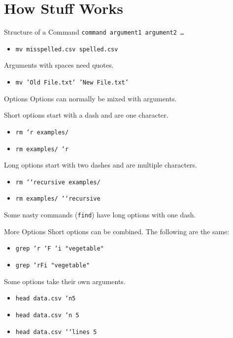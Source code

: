 \documentclass[pdf,usenames,dvipsnames,14pt]{beamer}%
\newcommand\hyphen{\char`\-}
\begin{document}
\section{How Stuff Works}

\begin{frame}{Structure of a Command}
	\texttt{command argument1 argument2 \dots}
	\begin{itemize}
		\item \texttt{mv misspelled.csv spelled.csv}
	\end{itemize}
	
	Arguments with spaces need quotes.
	\begin{itemize}
		\item \texttt{mv 'Old File.txt' 'New File.txt'}
	\end{itemize}
\end{frame}

\begin{frame}{Options}
	Options can normally be mixed with arguments.
	
	Short options start with a dash and are one character.
	\begin{itemize}
		\item \texttt{rm \hyphen r examples/}
		\item \texttt{rm examples/ \hyphen r}
	\end{itemize}
	
	Long options start with two dashes and are multiple characters.
	\begin{itemize}
		\item \texttt{rm \hyphen\hyphen recursive examples/}
		\item \texttt{rm examples/ \hyphen\hyphen recursive}
	\end{itemize}
	
	Some nasty commands (\texttt{find}) have long options with one dash.
\end{frame}

\begin{frame}{More Options}
	Short options can be combined. The following are the same:
	\begin{itemize}
		\item \texttt{grep \hyphen r \hyphen F \hyphen i "vegetable"}
		\item \texttt{grep \hyphen rFi "vegetable"}
	\end{itemize}
	Some options take their own arguments.
	\begin{itemize}
		\item \texttt{head data.csv \hyphen n5}
		\item \texttt{head data.csv \hyphen n 5}
		\item \texttt{head data.csv \hyphen\hyphen lines 5}
	\end{itemize}
\end{frame}
\end{document}
